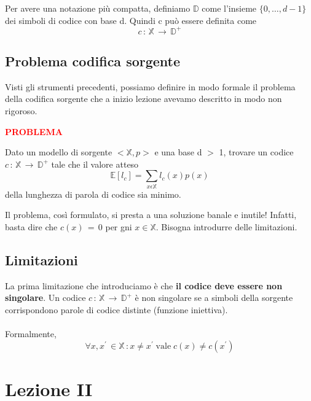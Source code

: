 \documentclass[12pt]{report}
\begin{document}
    \noindent Per avere una notazione più compatta, definiamo $\mathbb{D}$ come l'insieme $\{0,\dots,d-1\}$ dei simboli di codice con base d. Quindi c può essere definita come  $$c\,:\, \mathbb{X} \, \rightarrow \, \mathbb{D}^+$$

    \section{Problema codifica sorgente}

    Visti gli strumenti precedenti, possiamo definire in modo formale il problema della codifica sorgente che a inizio lezione avevamo descritto in modo non rigoroso.

    \vspace{5px}
    \begin{tcolorbox}
        \textbf{\textcolor{red}{PROBLEMA}}
        \vspace{5px}
        \begin{center}
            Dato un modello di sorgente $<\mathbb{X},p>$ e una base d $>$ 1, trovare un codice $c\,:\,\mathbb{X} \, \rightarrow \, \mathbb{D}^+$ tale che il valore atteso $$\mathbb{E}[l_c] = \sum_{x\epsilon\mathbb{X}} l_c(x) p(x)$$ della lunghezza di parola di codice sia minimo.
        \end{center}
    \end{tcolorbox}
    \vspace{5px}

    \noindent Il problema, così formulato, si presta a una soluzione banale e inutile! Infatti, basta dire che $c(x)\,=\,0$ per gni $x \in \mathbb{X}$. Bisogna introdurre delle limitazioni.

    \section{Limitazioni}

    La prima limitazione che introduciamo è che \textbf{il codice deve essere non singolare}. Un codice $c\,:\,\mathbb{X}\,\rightarrow \, \mathbb{D}^+$ è non singolare se a simboli della sorgente corrispondono parole di codice distinte (funzione iniettiva).  \\
    \\
    Formalmente, $$\forall x,x^{'} \, \in \mathbb{X}\,: x\neq x^{'} \; \text{vale} \; c(x) \neq c(x^{'})$$

    \chapter{Lezione II}
    \label{cap:Lezione II}
\end{document}
